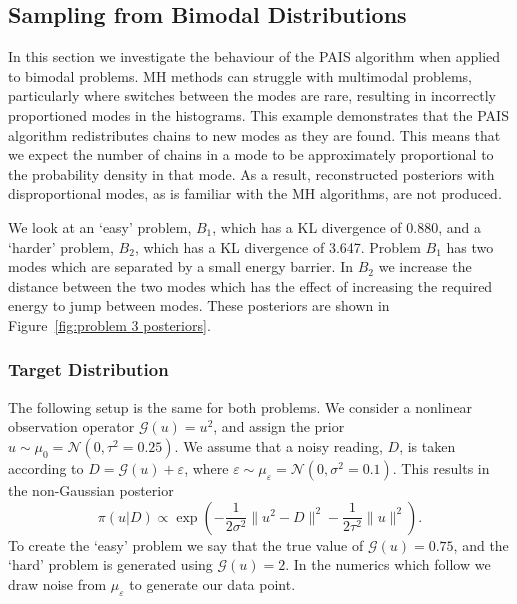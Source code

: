 \documentclass[final]{siamltex}
\newcommand{\G}{\mathcal{G}}
\newcommand{\N}{\mathcal{N}}
\begin{document}
\subsection{Sampling from Bimodal Distributions}

In this section we investigate the behaviour of the PAIS algorithm
when applied to bimodal problems. MH methods can
struggle with multimodal problems, particularly where switches between
the modes are rare, resulting in incorrectly proportioned modes in the
histograms. This example demonstrates that the PAIS algorithm redistributes 
chains to new modes as they are found. This means that we expect the number of chains in a mode to be
approximately proportional to the probability density in that mode. As a result, reconstructed posteriors with disproportional modes, as is familiar with the MH algorithms, are not produced.

We look at an `easy' problem, $B_1$, which has a KL divergence of 0.880, and a `harder' problem, $B_2$, which has a KL divergence of 3.647. Problem $B_1$ has two modes which are separated by a small energy barrier. In $B_2$ we increase the distance between the two modes which has the effect of increasing the required energy to jump between modes. These posteriors are shown in Figure~\ref{fig:problem 3 posteriors}.

\subsubsection{Target Distribution}

The following setup is the same for both problems. We consider a nonlinear observation operator $\G(u) = u^2$, and assign the prior $u \sim \mu_0 = \N(0, \tau^2=0.25)$. We assume that a noisy reading, $D$, is taken according to $D = \G(u) + \varepsilon$, where $\varepsilon \sim \mu_\varepsilon = \N(0, \sigma^2 = 0.1)$. This results in the non-Gaussian posterior
\[
	\pi(u|D) \propto \exp\left(-\frac{1}{2\sigma^2}\|u^2 - D\|^2 - \frac{1}{2\tau^2}\|u\|^2\right).
\]
To create the `easy' problem we say that the true value of $\G(u) = 0.75$, and the `hard' problem is generated using $\G(u) = 2$. In the numerics which follow we draw noise from $\mu_\varepsilon$ to generate our data point.
\end{document}
